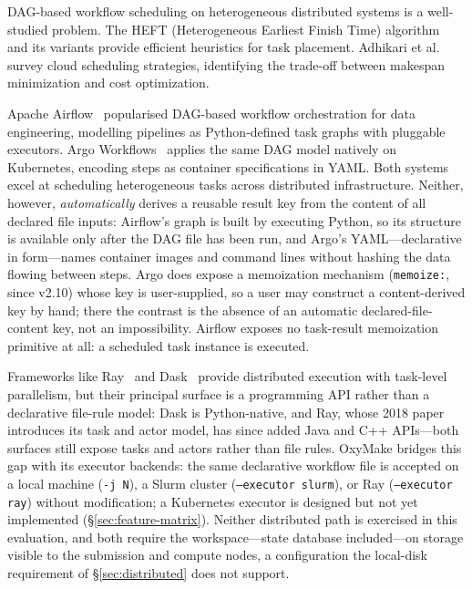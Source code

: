 \documentclass[12pt,a4paper]{article}
\newcommand{\code}[1]{{\texttt{\small\color{inlinecode}#1}}}
\begin{document}
DAG-based workflow scheduling on heterogeneous distributed systems is a
well-studied problem. The HEFT (Heterogeneous Earliest Finish Time)
algorithm~\cite{topcuogluPerformanceeffectiveAndLowcomplexity2002} and its
variants provide efficient heuristics for task placement. Adhikari et
al.~\cite{adhikariSurveySchedulingStrategies2019} survey cloud scheduling
strategies, identifying the trade-off between makespan minimization and
cost optimization.

Apache Airflow~\cite{airflow} popularised DAG-based workflow orchestration for
data engineering, modelling pipelines as Python-defined task graphs with
pluggable executors.  Argo Workflows~\cite{argoWorkflows} applies the same DAG
model natively on Kubernetes, encoding steps as container specifications in
YAML.  Both systems excel at scheduling heterogeneous tasks across distributed
infrastructure. Neither, however, \emph{automatically} derives a
reusable result key from the content of all declared file inputs:
Airflow's graph is built by executing Python, so its structure is
available only after the DAG file has been run, and Argo's
YAML---declarative in form---names container images and command lines
without hashing the data flowing between steps. Argo does expose a
memoization mechanism (\code{memoize:}, since v2.10) whose key is
user-supplied, so a user may construct a content-derived key by hand;
there the contrast is the absence of an automatic
declared-file-content key, not an impossibility. Airflow exposes no
task-result memoization primitive at all: a scheduled task instance is
executed.

Frameworks like Ray~\cite{moritzRayDistributedFramework2018} and
Dask~\cite{rocklinDaskParallelComputation2015} provide distributed
execution with task-level parallelism, but their principal surface is a
programming API rather than a declarative file-rule model: Dask is
Python-native, and Ray, whose 2018 paper introduces its task and actor
model, has since added Java and C++ APIs---both surfaces still expose
tasks and actors rather than file rules. OxyMake
bridges this gap
with its executor backends: the same declarative workflow file is
accepted on a local machine
(\code{-j~N}), a Slurm cluster (\code{--executor slurm}), or Ray
(\code{--executor ray}) without modification; a Kubernetes executor is
designed but not yet implemented (\S\ref{sec:feature-matrix}). Neither
distributed path is exercised in this evaluation, and both require the
workspace---state database included---on storage visible to the
submission and compute nodes, a configuration the local-disk
requirement of \S\ref{sec:distributed} does not support.
\end{document}
